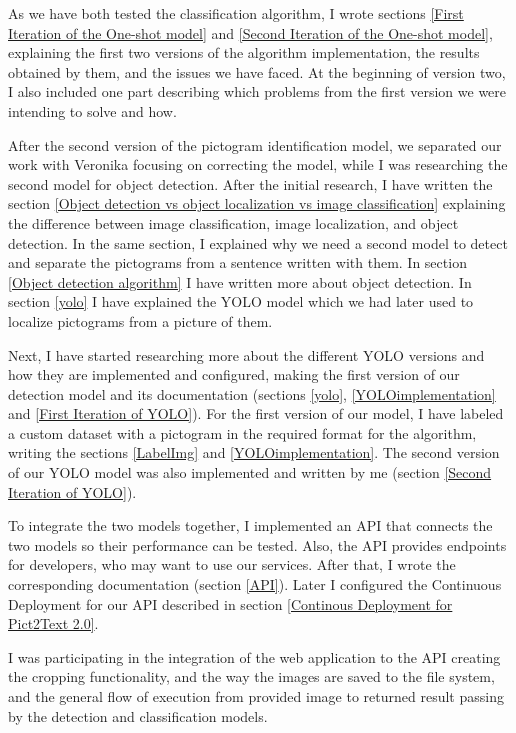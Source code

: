 As we have both tested the classification algorithm, I wrote sections \ref{First Iteration of the One-shot model} and \ref{Second Iteration of the One-shot model}, explaining the first two versions of the algorithm implementation, the results obtained by them, and the issues we have faced. At the beginning of version two, I also included one part describing which problems from the first version we were intending to solve and how.

After the second version of the pictogram identification model, we separated our work with Veronika focusing on correcting the model, while I was researching the second model for object detection. After the initial research, I have written the section \ref{Object detection vs object localization vs image classification} explaining the difference between image classification, image localization, and object detection. In the same section, I explained why we need a second model to detect and separate the pictograms from a sentence written with them. In section \ref{Object detection algorithm} I have written more about object detection. In section \ref{yolo} I have explained the YOLO model which we had later used to localize pictograms from a picture of them.

Next, I have started researching more about the different YOLO versions and how they are implemented and configured, making the first version of our detection model and its documentation (sections \ref{yolo}, \ref{YOLOimplementation} and \ref{First Iteration of YOLO}). For the first version of our model, I have labeled a custom dataset with a pictogram in the required format for the algorithm, writing the sections \ref{LabelImg} and \ref{YOLOimplementation}. The second version of our YOLO model was also implemented and written by me (section \ref{Second Iteration of YOLO}).

To integrate the two models together, I implemented an API that connects the two models so their performance can be tested. Also, the API provides endpoints for developers, who may want to use our services. After that, I wrote the corresponding documentation (section \ref{API}). Later I configured the Continuous Deployment for our API described in section \ref{Continous Deployment for Pict2Text 2.0}.

I was participating in the integration of the web application to the API creating the cropping functionality, and the way the images are saved to the file system, and the general flow of execution from provided image to returned result passing by the detection and classification models.

